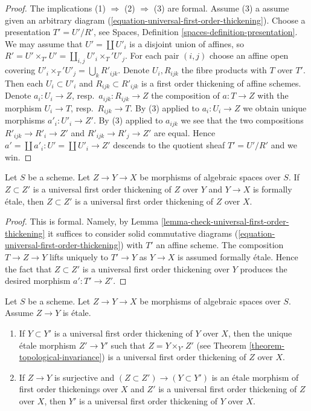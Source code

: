 \begin{proof}
The implications (1) $\Rightarrow$ (2) $\Rightarrow$ (3) are formal.
Assume (3) a assume given an arbitrary diagram
(\ref{equation-universal-first-order-thickening}).
Choose a presentation $T' = U'/R'$, see
Spaces, Definition \ref{spaces-definition-presentation}.
We may assume that $U' = \coprod U'_i$ is a disjoint union
of affines, so $R' = U' \times_{T'} U' = \coprod_{i, j} U'_i \times_T' U'_j$.
For each pair $(i, j)$ choose an affine open covering
$U'_i \times_T' U'_j = \bigcup_k R'_{ijk}$. Denote $U_i, R_{ijk}$
the fibre products with $T$ over $T'$. Then each
$U_i \subset U'_i$ and $R_{ijk} \subset R'_{ijk}$
is a first order thickening of affine schemes.
Denote $a_i : U_i \to Z$, resp.\ $a_{ijk} : R_{ijk} \to Z$
the composition of $a : T \to Z$ with the morphism
$U_i \to T$, resp.\ $R_{ijk} \to T$.
By (3) applied to $a_i : U_i \to Z$
we obtain unique morphisms $a'_i : U'_i \to Z'$.
By (3) applied to $a_{ijk}$ we see that the two compositions
$R'_{ijk} \to R'_i \to Z'$ and $R'_{ijk} \to R'_j \to Z'$
are equal. Hence $a' = \coprod a'_i : U' = \coprod U'_i \to Z'$
descends to the quotient sheaf $T' = U'/R'$ and we win.
\end{proof}

\begin{lemma}
\label{lemma-universal-thickening-over-formally-etale}
Let $S$ be a scheme.
Let $Z \to Y \to X$ be morphisms of algebraic spaces over $S$.
If $Z \subset Z'$ is a universal first order thickening of
$Z$ over $Y$ and $Y \to X$ is formally \'etale, then $Z \subset Z'$ is
a universal first order thickening of $Z$ over $X$.
\end{lemma}

\begin{proof}
This is formal. Namely, by
Lemma \ref{lemma-check-universal-first-order-thickening}
it suffices to consider solid commutative diagrams
(\ref{equation-universal-first-order-thickening})
with $T'$ an affine scheme. The composition
$T \to Z \to Y$ lifts uniquely to $T' \to Y$ as $Y \to X$ is
assumed formally \'etale. Hence the fact that
$Z \subset Z'$ is a universal first order thickening over $Y$
produces the desired morphism $a' : T' \to Z'$.
\end{proof}

\begin{lemma}
\label{lemma-etale-morphism-of-universal-thickenings}
Let $S$ be a scheme.
Let $Z \to Y \to X$ be morphisms of algebraic spaces over $S$.
Assume $Z \to Y$ is \'etale.
\begin{enumerate}
\item If $Y \subset Y'$ is a universal first order thickening of
$Y$ over $X$, then the unique \'etale morphism $Z' \to Y'$ such
that $Z = Y \times_{Y'} Z'$ (see
Theorem \ref{theorem-topological-invariance})
is a universal first order thickening of $Z$ over $X$.
\item If $Z \to Y$ is surjective and
$(Z \subset Z') \to (Y \subset Y')$ is an \'etale morphism
of first order thickenings over $X$ and $Z'$ is a universal first
order thickening of $Z$ over $X$, then $Y'$ is a universal first
order thickening of $Y$ over $X$.
\end{enumerate}
\end{lemma}

